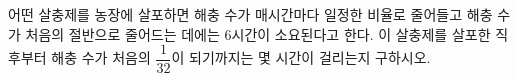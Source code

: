 어떤 살충제를 농장에 살포하면 해충 수가 매시간마다 일정한 비율로 줄어들고 해충 수가 처음의 절반으로 줄어드는 데에는 $6$시간이 소요된다고 한다. 이 살충제를 살포한 직후부터 해충 수가 처음의 $\dfrac{1}{32}$이 되기까지는 몇 시간이 걸리는지 구하시오.
